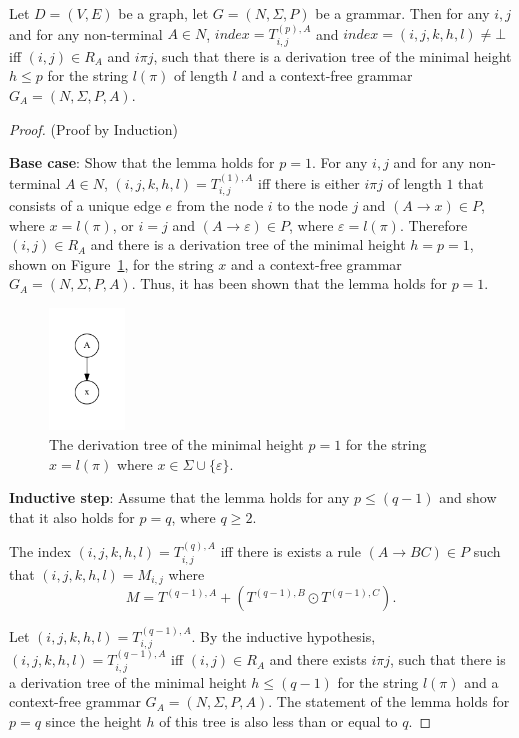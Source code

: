 \begin{lemma}\label{lemma:correctness}
	Let $D = (V,E)$ be a graph, let $G =(N,\Sigma,P)$ be a grammar. Then for any $i, j$ and for any non-terminal $A \in N$, $index = T^{(p),A}_{i,j}$ and $index = (i,j,k,h,l) \neq \bot$ iff $(i,j) \in R_A$ and $i \pi j$, such that there is a derivation tree of the minimal height $h \leq p$ for the string $l(\pi)$  of length $l$ and a context-free grammar $G_A = (N,\Sigma,P,A)$.
\end{lemma}
\begin{proof}(Proof by Induction)
	
	\textbf{Base case}: Show that the lemma holds for $p = 1$. For any $i, j$ and for any non-terminal $A \in N$, $(i,j,k,h,l) = T^{(1), A}_{i,j}$ iff there is either $i \pi j$ of length $1$ that consists of a unique edge $e$ from the node $i$ to the node $j$ and $(A \rightarrow x) \in P$, where $x = l(\pi)$, or $i = j$ and $(A \rightarrow \varepsilon) \in P$, where $\varepsilon = l(\pi)$. Therefore $(i,j) \in R_A$ and there is a derivation tree of the minimal height $h = p = 1$, shown on Figure~\ref{tree1}, for the string $x$ and a context-free grammar $G_A = (N,\Sigma,P,A)$. Thus, it has been shown that the lemma holds for $p = 1$.
	
	\begin{figure}[h!]
		\centering
		\includegraphics[width=2cm]{pictures/tree1.pdf}
		\caption{The derivation tree of the minimal height $p = 1$ for the string $x = l(\pi)$ where $x \in \Sigma \cup \{\varepsilon\}$.}
		\label{tree1}
	\end{figure}
	
	\textbf{Inductive step}: Assume that the lemma holds for any $p \leq (q - 1)$ and show that it also holds for $p = q$, where $q \geq 2$.
	
	The index $(i,j,k,h,l) = T^{(q),A}_{i,j}$ iff there is exists a rule $(A \to B C) \in P$ such that $(i,j,k,h,l) = M_{i,j}$ where $$M = T^{(q-1),A} + (T^{(q-1),B} \odot T^{(q-1),C}).$$ 
	
	Let $(i,j,k,h,l) = T^{(q-1),A}_{i,j}$. By the inductive hypothesis, $(i,j,k,h,l) = T^{(q-1),A}_{i,j}$ iff $(i,j) \in R_A$ and there exists $i \pi j$, such that there is a derivation tree of the minimal height $h \leq (q-1)$ for the string $l(\pi)$ and a context-free grammar $G_A = (N,\Sigma,P,A)$. The statement of the lemma holds for $p = q$ since the height $h$ of this tree is also less than or equal to $q$.
	

\end{proof}
